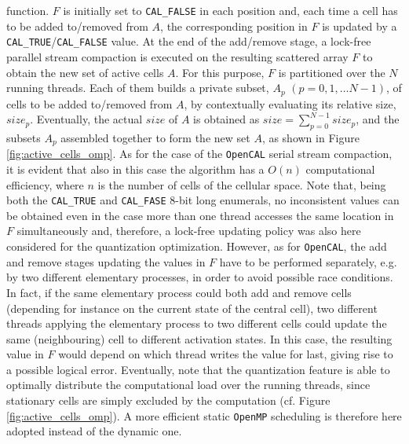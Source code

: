 function. $F$ is initially set to \verb'CAL_FALSE' in each position
and, each time a cell has to be added to/removed from $A$, the
corresponding position in $F$ is updated by a \verb'CAL_TRUE'/\verb'CAL_FALSE' value. 
At the end of the add/remove
stage, a lock-free parallel stream compaction is executed on the
resulting scattered array $F$ to obtain the new set of active cells
$A$. For this purpose, $F$ is partitioned over the $N$ running
threads. Each of them builds a private subset, $A_p$ $(p=0, 1,
\ldots N-1)$, of cells to be added to/removed from $A$, by
contextually evaluating its relative size, $size_p$. Eventually, the
actual $size$ of $A$ is obtained as $size = \sum_{p=0}^{N-1}
size_p$, and the subsets $A_p$ assembled together to form the new
set $A$, as shown in Figure \ref{fig:active_cells_omp}. As for the
case of the \texttt{OpenCAL} serial stream compaction, it is evident that
also in this case the algorithm has a $O(n)$ computational
efficiency, where $n$ is the number of cells of the cellular
space. Note that, being both the \verb'CAL_TRUE' and \verb'CAL_FASE'
8-bit long enumerals, no inconsistent values can be obtained even in
the case more than one thread accesses the same location in $F$
simultaneously and, therefore, a lock-free updating policy was also
here considered for the quantization optimization. However, as for
\texttt{OpenCAL}, the add and remove stages updating the values in $F$ have
to be performed separately, e.g. by two different elementary
processes, in order to avoid possible race conditions. In fact, if
the same elementary process could both add and remove cells
(depending for instance on the current state of the central cell),
two different threads applying the elementary process to two
different cells could update the same (neighbouring) cell to
different activation states. In this case, the resulting value in
$F$ would depend on which thread writes the value for last, giving
rise to a possible logical error. Eventually, note that the
quantization feature is able to optimally distribute the
computational load over the running threads, since stationary cells
are simply excluded by the computation (cf. Figure
\ref{fig:active_cells_omp}). A more efficient static \texttt{OpenMP}
scheduling is therefore here adopted instead of the dynamic one.

